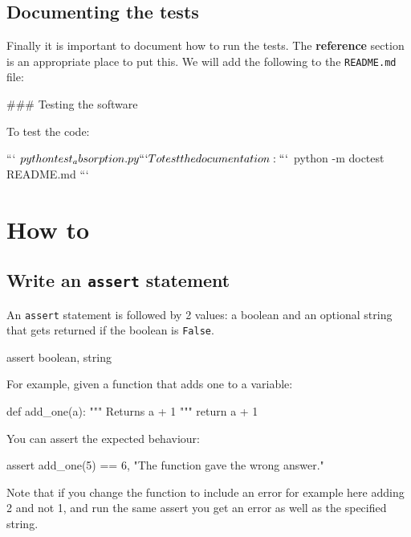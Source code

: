 \subsection{Documenting the tests}
\label{\detokenize{building-tools/07-testing/tutorial/main:documenting-the-tests}}

Finally it is important to document how to run the tests. The \textbf{reference}
section is an appropriate place to put this. We will add the following to the
\texttt{README.md} file:

\begin{md}
### Testing the software

To test the code:

```
$ python test_absorption.py
```

To test the documentation:

```
$ python -m doctest README.md
```
\end{md}

\section{How to}

\subsection{Write an \texttt{assert} statement}
\label{\detokenize{building-tools/07-testing/how/main:how-to-write-an-assert-statement}}

An \texttt{assert} statement is followed by 2 values: a boolean and an optional
string that gets returned if the boolean is \texttt{False}.


\begin{pyin}
assert boolean, string
\end{pyin}



For example, given a function that adds one to a variable:




\begin{pyin}
def add_one(a):
    """
    Returns a + 1
    """
    return a + 1
\end{pyin}

You can assert the expected behaviour:

\begin{pyin}
assert add_one(5) == 6, "The function gave the wrong answer."
\end{pyin}

Note that if you change the function to include an error for example here adding
2 and not 1, and run the same assert
you get an error as well as the specified string.

